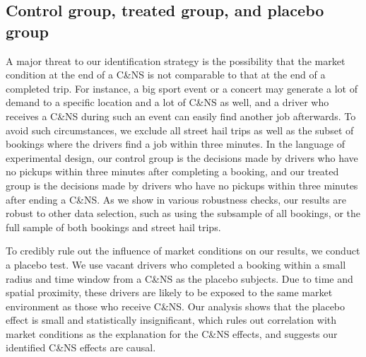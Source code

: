 \documentclass[reviewmode,AEJ]{AEA}
\begin{document}
\subsection{Control group, treated group, and placebo group}
A major threat to our identification strategy is the possibility that the market condition at the end of a C\&NS is not comparable to that at the end of a completed trip. For instance, a big sport event or a concert may generate a lot of demand to a specific location and a lot of C\&NS as well, and a driver who receives a C\&NS during such an event can easily find another job afterwards.
To avoid such circumstances, 
we exclude all street hail trips as well as the subset of bookings where the drivers find a job within three minutes. In the language of experimental design, our control group is the decisions made by drivers who have no pickups within three minutes after completing a booking, and our treated group is the decisions made by drivers who have no pickups within three minutes after ending a C\&NS. As we show in various robustness checks, our results are robust to other data selection, such as using the subsample of all bookings, or the full sample of both bookings and street hail trips.%

To credibly rule out the influence of market conditions on our results, we conduct a placebo test. We use vacant drivers who completed a booking within a small radius and time window from a C\&NS as the placebo subjects. Due to time and spatial proximity, these drivers are likely to be exposed to the same market environment as those who receive C\&NS. 
Our analysis shows that the placebo effect is small and statistically insignificant, which rules out correlation with market conditions as the explanation for the C\&NS effects, and suggests our identified C\&NS effects are causal.
\end{document}
